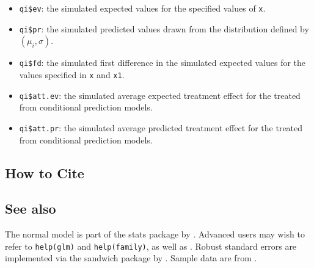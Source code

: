 \begin{itemize}
   \begin{itemize}
   \item {\tt qi\$ev}: the simulated expected values for the specified
     values of {\tt x}.
   \item {\tt qi\$pr}: the simulated predicted values drawn from the
     distribution defined by $(\mu_i, \sigma)$.
   \item {\tt qi\$fd}: the simulated first difference in the simulated
     expected values for the values specified in {\tt x} and {\tt x1}.
   \item {\tt qi\$att.ev}: the simulated average expected treatment
     effect for the treated from conditional prediction models.  
   \item {\tt qi\$att.pr}: the simulated average predicted treatment
     effect for the treated from conditional prediction models.  
   \end{itemize}
\end{itemize}

\subsection* {How to Cite} 




\subsection* {See also}

The normal model is part of the stats package by \citet{VenRip02}.
Advanced users may wish to refer to \texttt{help(glm)} and
\texttt{help(family)}, as well as \cite{McCNel89}. Robust standard
errors are implemented via the sandwich package by \citet{Zeileis04}.
Sample data are from \cite{KinTomWit00}.



 














